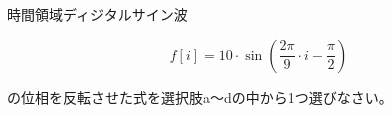 時間領域ディジタルサイン波 

\[
f[i] = 10 \cdot \sin \left ( \frac{2 \pi}{9}  \cdot i - \frac{\pi}{2} \right )
\]

\noindent の位相を反転させた式を選択肢a〜dの中から1つ選びなさい。
